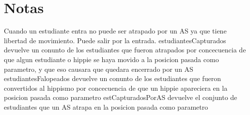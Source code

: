 \documentclass[10pt, a4paper]{article}
\renewcommand{\paratodo}[2]{$\forall~#2$: #1}
\begin{document}
\begin{tad}{}





\tadGeneradores


\tadObservadores


\tadAxiomas[\paratodo{nat}{an, al}, \paratodo{grilla}{g}, \paratodo{posicion}{p}]




\end{tad}

\section{Notas}

Cuando un estudiante entra no puede ser atrapado por un AS ya que tiene libertad de movimiento. Puede salir por la entrada.
\newline estudiantesCapturados devuelve un conunto de los estudiantes que fueron atrapados por concecuencia de que algun estudiante o hippie se haya movido a la posicion pasada como parametro, y que eso causara que quedara encerrado por un AS
\newline estudiantesFalopeados devuelve un conunto de los estudiantes que fueron convertidos al hippismo por concecuencia de que un hippie apareciera en la posicion pasada como parametro
\newline estCapturadosPorAS devuelve el conjunto de estudiantes que un AS atrapa en la posicion pasada como parametro
\end{document}
